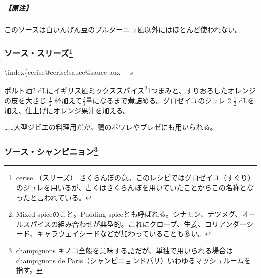 \begin{recette}
\hypertarget{nota-sauce-bretonne}{%
\subparagraph{【原注】}\label{nota-sauce-bretonne}}

このソースは\protect\hyperlink{haricots-blancs-bretonne}{白いんげん豆のブルターニュ風}以外にはほとんど使われない。

\hypertarget{sauce-aux-cerises}{%
\subsubsection[ソース・スリーズ]{\texorpdfstring{ソース・スリーズ\footnote{cerise
  （スリーズ）
  さくらんぼの意。このレシピではグロゼイユ（すぐり）のジュレを用いるが、古くはさくらんぼを用いていたことからこの名称となったと言われている。}}{ソース・スリーズ}}\label{sauce-aux-cerises}}


\textbackslash{}index\{cerise@cerise!sauce@sauce aux ---s

ポルト酒2 dLにイギリス風ミックススパイス\footnote{Mixed
  spiceのこと。Pudding
  spiceとも呼ばれる。シナモン、ナツメグ、オールスパイスの組み合わせが典型的。これにクローブ、生姜、コリアンダーシード、キャラウェイシードなどが加わっていることも多い。}1つまみと、すりおろしたオレンジの皮を大さじ
\(\frac{1}{2}\)
杯加えて\(\frac{2}{3}\)量になるまで煮詰める。\protect\hyperlink{gelee-de-groseilles-a}{グロゼイユのジュレ}
2 \(\frac{1}{2}\) dLを加え、仕上げにオレンジ果汁を加える。

\ldots{}\ldots{}大型ジビエの料理用だが、鴨のポワレやブレゼにも用いられる。

\hypertarget{sauce-aux-champignons}{%
\subsubsection[ソース・シャンピニョン]{\texorpdfstring{ソース・シャンピニョン\footnote{champignons
  キノコ全般を意味する語だが、単独で用いられる場合は champignons de
  Paris（シャンピニョンドパリ）いわゆるマッシュルームを指す。}}{ソース・シャンピニョン}}\label{sauce-aux-champignons}}




\end{recette}
